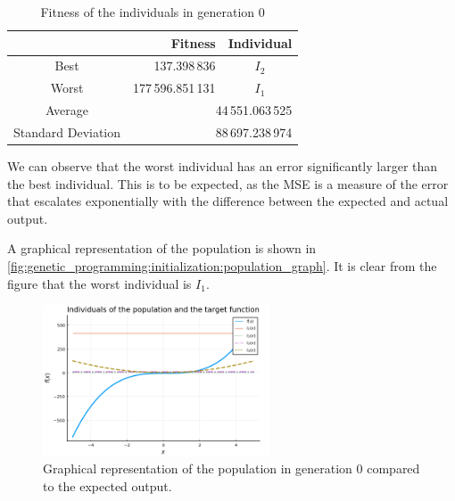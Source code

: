   \begin{table}[ht!]
    \centering
    \begin{tabular}{|c|r|c|}
      \hline
      & \textbf{Fitness} & \textbf{Individual}  \\
      \hline
      Best & 137.398\,836 & \(I_2\) \\
      Worst & 177\,596.851\,131 & \(I_1\) \\
      \hline
      \hline
      Average & \multicolumn{2}{r|}{44\,551.063\,525} \\
      \hline
      Standard Deviation & \multicolumn{2}{r|}{88\,697.238\,974} \\
      \hline
    \end{tabular}
    \caption{Fitness of the individuals in generation 0}
    \label{tab:genetic_programming:initialization:fitness}
  \end{table}

  We can observe that the worst individual has an error significantly larger
  than the best individual.
  This is to be expected, as the MSE is a measure of the error that escalates
  exponentially with the difference between the expected and actual output.  

  A graphical representation of the population is shown in
  \vref{fig:genetic_programming:initialization:population_graph}.
  It is clear from the figure that the worst individual is \(I_1\).

  \begin{figure}[ht!]
    \centering
    \includegraphics[width=0.6\textwidth]{img/theoretical_framework/gp_pop_1.png}
    \caption{
      Graphical representation of the population in generation 0 compared to the
      expected output.
    }
    \label{fig:genetic_programming:initialization:population_graph}
  \end{figure}

